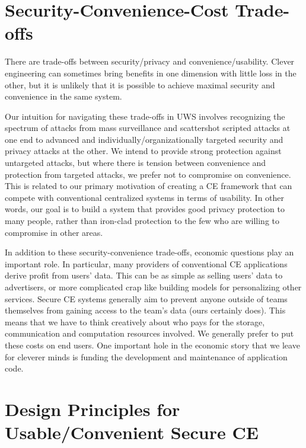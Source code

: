 \documentclass{article}
\begin{document}
\section{Security-Convenience-Cost Trade-offs}

There are trade-offs between security/privacy and convenience/usability.
Clever engineering can sometimes bring benefits in one dimension with little loss in the other, but it is unlikely that it is possible to achieve maximal security and convenience in the same system.

Our intuition for navigating these trade-offs in UWS involves recognizing the spectrum of attacks from mass surveillance and scattershot scripted attacks at one end to advanced and individually/organizationally targeted security and privacy attacks at the other.
We intend to provide strong protection against untargeted attacks, but where there is tension between convenience and protection from targeted attacks, we prefer not to compromise on convenience.
This is related to our primary motivation of creating a CE framework that can compete with conventional centralized systems in terms of usability.
In other words, our goal is to build a system that provides good privacy protection to many people, rather than iron-clad protection to the few who are willing to compromise in other areas.

In addition to these security-convenience trade-offs, economic questions play an important role.
In particular, many providers of conventional CE applications derive profit from users' data.
This can be as simple as selling users' data to advertisers, or more complicated crap like building models for personalizing other services.
Secure CE systems generally aim to prevent anyone outside of teams themselves from gaining access to the team's data (ours certainly does).
This means that we have to think creatively about who pays for the storage, communication and computation resources involved.
We generally prefer to put these costs on end users.
One important hole in the economic story that we leave for cleverer minds is funding the development and maintenance of application code.


\section{Design Principles for Usable/Convenient Secure CE}
\end{document}
